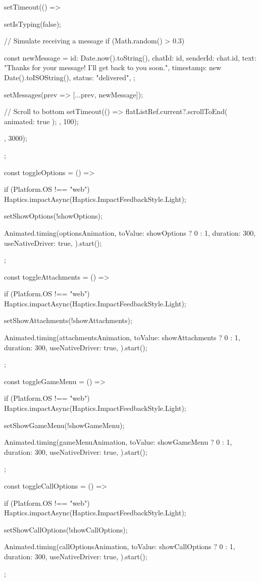 {{    setTimeout(() => {
      setIsTyping(false);
      
      // Simulate receiving a message
      if (Math.random() > 0.3) {
        const newMessage = {
          id: Date.now().toString(),
          chatId: id,
          senderId: chat.id,
          text: "Thanks for your message! I'll get back to you soon.",
          timestamp: new Date().toISOString(),
          status: "delivered",
        };
        
        setMessages(prev => [...prev, newMessage]);
        
        // Scroll to bottom
        setTimeout(() => {
          flatListRef.current?.scrollToEnd({ animated: true });
        }, 100);
      }
    }, 3000);
  };
  
  const toggleOptions = () => {
    if (Platform.OS !== "web") {
      Haptics.impactAsync(Haptics.ImpactFeedbackStyle.Light);
    }
    
    setShowOptions(!showOptions);
    
    Animated.timing(optionsAnimation, {
      toValue: showOptions ? 0 : 1,
      duration: 300,
      useNativeDriver: true,
    }).start();
  };

  const toggleAttachments = () => {
    if (Platform.OS !== "web") {
      Haptics.impactAsync(Haptics.ImpactFeedbackStyle.Light);
    }
    
    setShowAttachments(!showAttachments);
    
    Animated.timing(attachmentsAnimation, {
      toValue: showAttachments ? 0 : 1,
      duration: 300,
      useNativeDriver: true,
    }).start();
  };

  const toggleGameMenu = () => {
    if (Platform.OS !== "web") {
      Haptics.impactAsync(Haptics.ImpactFeedbackStyle.Light);
    }
    
    setShowGameMenu(!showGameMenu);
    
    Animated.timing(gameMenuAnimation, {
      toValue: showGameMenu ? 0 : 1,
      duration: 300,
      useNativeDriver: true,
    }).start();
  };

  const toggleCallOptions = () => {
    if (Platform.OS !== "web") {
      Haptics.impactAsync(Haptics.ImpactFeedbackStyle.Light);
    }
    
    setShowCallOptions(!showCallOptions);
    
    Animated.timing(callOptionsAnimation, {
      toValue: showCallOptions ? 0 : 1,
      duration: 300,
      useNativeDriver: true,
    }).start();
  };

}
